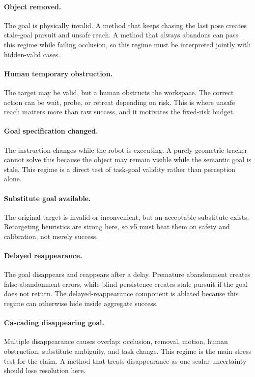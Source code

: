 \documentclass{article}
\begin{document}
\paragraph{Object removed.}
The goal is physically invalid. A method that keeps chasing the last pose creates stale-goal pursuit and unsafe reach. A method that always abandons can pass this regime while failing occlusion, so this regime must be interpreted jointly with hidden-valid cases.

\paragraph{Human temporary obstruction.}
The target may be valid, but a human obstructs the workspace. The correct action can be wait, probe, or retreat depending on risk. This is where unsafe reach matters more than raw success, and it motivates the fixed-risk budget.

\paragraph{Goal specification changed.}
The instruction changes while the robot is executing. A purely geometric tracker cannot solve this because the object may remain visible while the semantic goal is stale. This regime is a direct test of task-goal validity rather than perception alone.

\paragraph{Substitute goal available.}
The original target is invalid or inconvenient, but an acceptable substitute exists. Retargeting heuristics are strong here, so v5 must beat them on safety and calibration, not merely success.

\paragraph{Delayed reappearance.}
The goal disappears and reappears after a delay. Premature abandonment creates false-abandonment errors, while blind persistence creates stale pursuit if the goal does not return. The delayed-reappearance component is ablated because this regime can otherwise hide inside aggregate success.

\paragraph{Cascading disappearing goal.}
Multiple disappearance causes overlap: occlusion, removal, motion, human obstruction, substitute ambiguity, and task change. This regime is the main stress test for the claim. A method that treats disappearance as one scalar uncertainty should lose resolution here.
\end{document}
